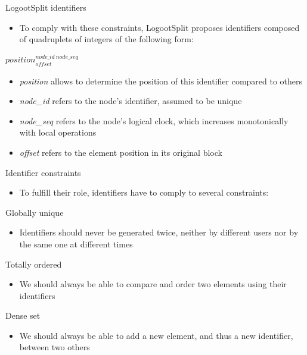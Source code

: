\documentclass[10pt]{beamer}
\newcommand{\trm}[1]{\mathit{#1}}
\newcommand{\id}[3]{$\trm{#1}^{\trm{#2}}_{\trm{#3}}$}
\begin{document}
\begin{frame}{LogootSplit identifiers}
  \begin{itemize}
    \item To comply with these constraints, LogootSplit proposes identifiers composed of quadruplets of integers of the following form:
  \end{itemize}
  \begin{center}
    \id{position}{node\_id~node\_seq}{offset}
  \end{center}
  \begin{itemize}
    \item \emph{position} allows to determine the position of this identifier compared to others
    \item \emph{node\_id} refers to the node's identifier, assumed to be unique
    \item \emph{node\_seq} refers to the node's logical clock, which increases monotonically with local operations
    \item \emph{offset} refers to the element position in its original block
  \end{itemize}
\end{frame}

\begin{frame}{Identifier constraints}
  \begin{itemize}
    \item To fulfill their role, identifiers have to comply to several constraints:
  \end{itemize}

  \begin{block}{Globally unique}
    \begin{itemize}
      \item Identifiers should never be generated twice, neither by different users nor by the same one at different times
    \end{itemize}
  \end{block}
  \begin{block}{Totally ordered}
    \begin{itemize}
      \item We should always be able to compare and order two elements using their identifiers
    \end{itemize}
  \end{block}
  \begin{block}{Dense set}
    \begin{itemize}
      \item We should always be able to add a new element, and thus a new identifier, between two others
    \end{itemize}
  \end{block}
\end{frame}
\end{document}
